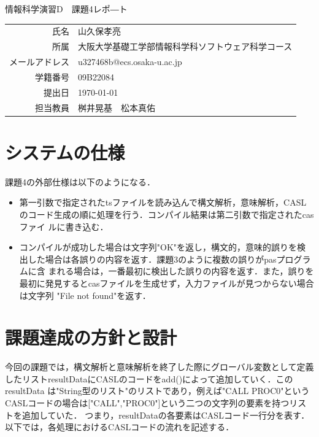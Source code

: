 \documentclass[dvipdfmx]{jarticle}
\begin{document}
\begin{titlepage}
    \begin{center}
        {\huge 情報科学演習D　課題4レポ―ト}
        \vspace{180pt}\\
        \begin{tabular}{rl}
            氏名 & 山久保孝亮\\
            所属 & 大阪大学基礎工学部情報科学科ソフトウェア科学コース\\
            メールアドレス & u327468b@ecs.osaka-u.ac.jp\\
            学籍番号 & 09B22084\\
            提出日 & \today\\
            担当教員 & 桝井晃基　松本真佑
        \end{tabular}
    \end{center}
\end{titlepage}
\section{システムの仕様}
課題4の外部仕様は以下のようになる．
\begin{itemize}
  \item 第一引数で指定されたtsファイルを読み込んで構文解析，意味解析，CASLのコード生成の順に処理を行う．コンパイル結果は第二引数で指定されたcasファイ
  ルに書き込む．
  \item コンパイルが成功した場合は文字列"OK"を返し，構文的，意味的誤りを検出した場合は各誤りの内容を返す．課題3のように複数の誤りがpasプログラムに含
  まれる場合は，一番最初に検出した誤りの内容を返す．また，誤りを最初に発見するとcasファイルを生成せず，入力ファイルが見つからない場合は文字列
  "File not found"を返す．
\end{itemize}
\section{課題達成の方針と設計}
今回の課題では，構文解析と意味解析を終了した際にグローバル変数として定義したリストresultDataにCASLのコードをadd()によって追加していく．このresultData
は"String型のリスト"のリストであり，例えば"CALL PROC0"というCASLコードの場合は["CALL","PROC0"]という二つの文字列の要素を持つリストを追加していた．
つまり，resultDataの各要素はCASLコード一行分を表す．
\\以下では，各処理におけるCASLコードの流れを記述する．
\end{document}
